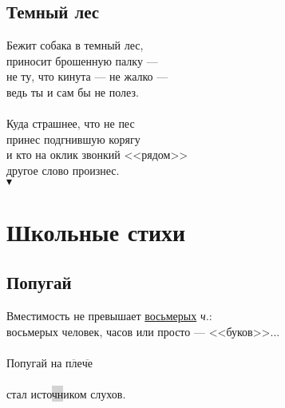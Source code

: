 \documentclass[12pt,a5paper]{report}
\newcommand{\textoverline}[1]{$\overline{\mbox{#1}}$}
\begin{document}
\newpage
\subsection{Темный лес}
Бежит собака в темный лес,\\ 
приносит брошенную палку ---\\ 
не ту, что кинута --- не жалко ---\\ 
ведь ты и сам бы не полез.\\ 
\\
Куда страшнее, что не пес\\ 
принес подгнившую корягу\\ 
и кто на оклик звонкий <<рядом>>\\ 
другое слово произнес.\\
\newline
\newline
$\blacktriangledown$





































\section{Школьные стихи}

\subsection{Попугай}
\label{popugai}

Вместимость  не превышает \hyperref[schety]{восьмерых} \emph{ч.}:\\
восьмерых человек, часов или просто --- <<буков>>...\\
\\
Попугай на \textoverline{пле}\textoverline{че}\\
\\
стал исто\colorbox{lightgray}{чн}иком слухов.
\newpage
\end{document}
